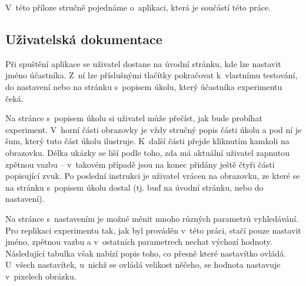 \openright
{}

V~této příloze stručně pojednáme o~aplikaci, která je součástí této práce. 

\subsection*{Uživatelská dokumentace}

Při spuštění aplikace se uživatel dostane na úvodní stránku, kde lze nastavit
jméno účastníka. Z~ní lze příslušnými tlačítky pokračovat k~vlastnímu
testování, do nastavení nebo na stránku s~popisem úkolu, který účastníka
experimentu čeká.

Na stránce s~popisem úkolu si uživatel může přečíst, jak bude probíhat experiment. V~horní části
obrazovky je vždy stručný popis části úkolu a pod ní je šum, který tuto část
úkolu ilustruje. K~další části přejde kliknutím kamkoli na obrazovku. Délka
ukázky se liší podle toho, zda má aktuální uživatel zapnutou zpětnou vazbu --
v~takovém případě jsou na konec přidány ještě čtyři části popisující zvuk. Po
poslední instrukci je uživatel vrácen na obrazovku, ze které se na stránku
s~popisem úkolu dostal (tj. buď na úvodní stránku, nebo do nastavení).

Na stránce s~nastavením je možné měnit mnoho různých parametrů vyhledávání. Pro
replikaci experimentu tak, jak byl prováděn v~této práci, stačí pouze nastavit
jméno, zpětnou vazbu a v~ostatních parametrech nechat výchozí hodnoty.
Následující tabulka však nabízí popis toho, co přesně které nastavítko ovládá.
U~všech nastavítek, u~nichž se ovládá velikost něčeho,
se hodnota nastavuje v~pixelech obrázku.
\bigskip

